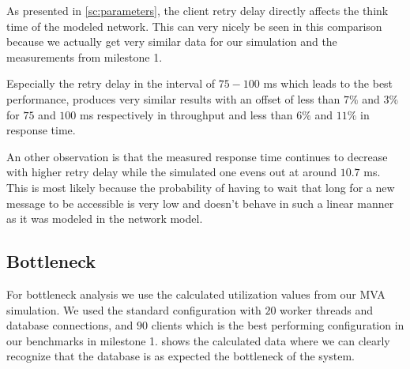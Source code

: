 \documentclass[a4paper, oneside]{csthesis}
\begin{document}
    As presented in \cref{sc:parameters}, the client retry delay directly
    affects the think time of the modeled network. This can very nicely be seen
    in this comparison because we actually get very similar data for our
    simulation and the measurements from milestone 1. 
    
    Especially the retry delay in the interval of $75-100$ ms which leads to the
    best performance, produces very similar results with an offset of less than
    $7 \%$ and $3 \%$ for $75$ and $100$ ms respectively in throughput and less
    than $6 \%$ and $11 \%$ in response time.
    
    An other observation is that the measured response time continues to
    decrease with higher retry delay while the simulated one evens out at around
    $10.7$ ms. This is most likely because the probability of having to wait
    that long for a new message to be accessible is very low and doesn't behave
    in such a linear manner as it was modeled in the network model.
    
    \newpage

\subsection{Bottleneck}
    For bottleneck analysis we use the calculated utilization values from our
    MVA simulation. We used the standard configuration with $20$ worker threads
    and database connections, and $90$ clients which is the best performing
    configuration in our \telesto{} benchmarks in milestone 1.
     shows the calculated data where we can clearly
    recognize that the database is as expected the bottleneck of the system.
    
     \begin{table}[ht]
        \centering
        
        \begin{adjustbox}{center}
        \end{adjustbox}
        \caption{Utilization of the load centers in the MVA simulation}
        \label{tbl:utilization}
    \end{table}
    
\end{document}
